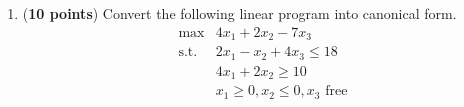\documentclass[10pt]{article}
\begin{document}
\begin{enumerate}
\item ({\bf 10 points}) Convert the following linear program into canonical form.
\[
\begin{array}{ll}
  \max & 4 x_1 + 2x_2 - 7 x_3 \\
  \mbox{s.t.} & 2 x_1 -  x_2 + 4 x_3 \leq 18 \\
  &  4 x_1 + 2 x_2 \geq 10 \\
  & x_1  \geq 0, x_2 \leq 0, x_3 \text{ free}
\end{array}
\]

\end{enumerate}
\end{document}
